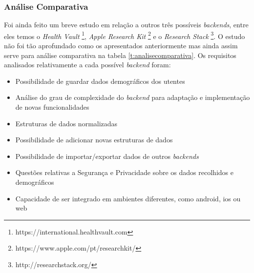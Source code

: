 \subsubsection{Análise Comparativa}
Foi ainda feito um breve estudo em relação a outros três possíveis \textit{backends}, entre eles temos o \textit{Health Vault} \footnote{https://international.healthvault.com}, \textit{Apple Research Kit} \footnote{https://www.apple.com/pt/researchkit/} e o \textit{Research Stack} \footnote{http://researchstack.org/}. O estudo não foi tão aprofundado como os apresentados anteriormente mas ainda assim serve para análise comparativa na tabela \ref{t:analisecomparativa}. Os requisitos analisados relativamente a cada possível \textit{backend} foram: 
\begin{itemize}
  \item Possibilidade de guardar dados demográficos dos utentes
  \item Análise do grau de complexidade  do \textit{backend} para adaptação e implementação de novas funcionalidades
  \item Estruturas de dados normalizadas
  \item Possibilidade de adicionar novas estruturas de dados 
  \item Possibilidade de importar/exportar dados de outros \textit{backends}
  \item Questões relativas a Segurança e Privacidade sobre os dados recolhidos e demográficos
  \item Capacidade de ser integrado em ambientes diferentes, como android, ios ou web
\end{itemize}

